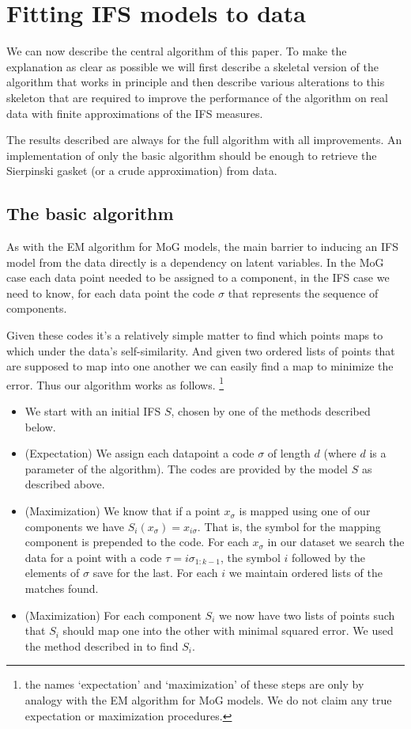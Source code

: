 \documentclass[10pt,a4paper,oneside]{article}
\theoremstyle{definition}
\begin{document}
\section*{Fitting IFS models to data}

We can now describe the central algorithm of this paper. To make the explanation as clear as possible we will first describe a skeletal version of the algorithm that works in principle and then describe various alterations to this skeleton that are required to improve the performance of the algorithm on real data with finite approximations of the IFS measures. 

The results described are always for the full algorithm with all improvements. An implementation of only the basic algorithm should be enough to retrieve the Sierpinski gasket (or a crude approximation) from data.

\subsection*{The basic algorithm}

As with the EM algorithm for MoG models, the main barrier to inducing an IFS model from the data directly is a dependency on latent variables. In the MoG case each data point needed to be assigned to a component, in the IFS case we need to know, for each data point the code $\sigma$ that represents the sequence of components. 

Given these codes it's a relatively simple matter to find which points maps to which under the data's self-similarity. And given two ordered lists of points that are supposed to map into one another we can easily find a map to minimize the error. Thus our algorithm works as follows. 
\footnote{the names `expectation' and `maximization' of these steps are only by analogy with the EM algorithm for MoG models. We do not claim any true expectation or maximization procedures.}

\begin{itemize}
\item We start with an initial IFS $S$, chosen by one of the methods described below. 
\item (Expectation) We assign each datapoint a code $\sigma$ of length $d$ (where $d$ is a parameter of the algorithm). The codes are provided by the model $S$ as described above. 
\item (Maximization) We know that if a point $x_\sigma$ is mapped using one of our components we have $S_i(x_\sigma) = x_{i\sigma}$. That is, the symbol for the mapping component is prepended to the code. For each $x_\sigma$ in our dataset we search the data for a point with a code $\tau = i\sigma_{1:k-1}$, the symbol $i$ followed by the elements of $\sigma$ save for the last. For each $i$ we maintain ordered lists of the matches found.
\item (Maximization) For each component $S_i$ we now have two lists of points such that $S_i$ should map one into the other with minimal squared error. We used the method described in \cite{umeyama1991least} to find $S_i$. 
\end{itemize}
\end{document}
